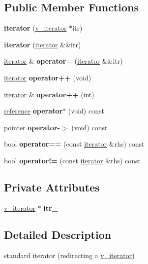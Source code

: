 \subsection*{Public Member Functions}
\begin{DoxyCompactItemize}
\item 
{\bfseries iterator} (\mbox{\hyperlink{class_s_m_spp__di__unipi__it_1_1_thin_var_dep_interface_1_1v__iterator}{v\+\_\+iterator}} $\ast$itr)
\item 
{\bfseries iterator} (\mbox{\hyperlink{class_s_m_spp__di__unipi__it_1_1_thin_var_dep_interface_1_1iterator}{iterator}} \&\&itr)
\item 
\mbox{\hyperlink{class_s_m_spp__di__unipi__it_1_1_thin_var_dep_interface_1_1iterator}{iterator}} \& {\bfseries operator=} (\mbox{\hyperlink{class_s_m_spp__di__unipi__it_1_1_thin_var_dep_interface_1_1iterator}{iterator}} \&\&itr)
\item 
\mbox{\hyperlink{class_s_m_spp__di__unipi__it_1_1_thin_var_dep_interface_1_1iterator}{iterator}} {\bfseries operator++} (void)
\item 
\mbox{\hyperlink{class_s_m_spp__di__unipi__it_1_1_thin_var_dep_interface_1_1iterator}{iterator}} \& {\bfseries operator++} (int)
\item 
\mbox{\hyperlink{class_s_m_spp__di__unipi__it_1_1_variable}{reference}} {\bfseries operator$\ast$} (void) const
\item 
\mbox{\hyperlink{class_s_m_spp__di__unipi__it_1_1_variable}{pointer}} {\bfseries operator-\/$>$} (void) const
\item 
bool {\bfseries operator==} (const \mbox{\hyperlink{class_s_m_spp__di__unipi__it_1_1_thin_var_dep_interface_1_1iterator}{iterator}} \&rhs) const
\item 
bool {\bfseries operator!=} (const \mbox{\hyperlink{class_s_m_spp__di__unipi__it_1_1_thin_var_dep_interface_1_1iterator}{iterator}} \&rhs) const
\end{DoxyCompactItemize}
\subsection*{Private Attributes}
\begin{DoxyCompactItemize}
\item 
\mbox{\hyperlink{class_s_m_spp__di__unipi__it_1_1_thin_var_dep_interface_1_1v__iterator}{v\+\_\+iterator}} $\ast$ {\bfseries itr\+\_\+}
\end{DoxyCompactItemize}


\subsection{Detailed Description}
standard iterator (redirecting a \mbox{\hyperlink{class_s_m_spp__di__unipi__it_1_1_thin_var_dep_interface_1_1v__iterator}{v\+\_\+iterator}}) 

